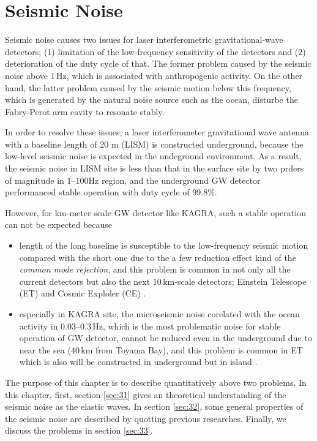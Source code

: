 \chapter{Seismic Noise}
Seismic noise causes two issues for laser interferometric gravitational-wave detectors; (1) limitation of the low-frequency sensitivity of the detectors and (2) deterioration of the duty cycle of that. The former problem caused by the seismic noise above $1\,\mathrm{Hz}$, which is associated with anthropogenic activity. On the other hand, the latter problem caused by the seismic motion below this frequency, which is generated by the natural noise source such as the ocean, disturbe the Fabry-Perot arm cavity to resonate stably.

In order to resolve these issues, a laser interferometer gravitational wave antenna with a baseline length of 20 m (LISM) \cite{sato2004ultrastable} is constructed underground, because the low-level seismic noise is expected in the undeground environment. As a result, the seismic noise in LISM site is less than that in the surface site by two prders of magnitude in $1$--$100\mathrm{Hz}$ region, and the underground GW detector performanced stable operation with duty cycle of $99.8 \%$.

However, for km-meter scale GW detector like KAGRA, such a stable operation can not be expected because
\begin{itemize}
  \setlength{\itemsep}{1pt}      %
  \setlength{\parskip}{-1pt}     %
  \setlength{\itemindent}{0pt}   %
  \setlength{\labelsep}{5pt}     %
\item length of the long baseline is susceptible to the low-frequency seismic motion compared with the short one due to the a few reduction effect kind of the {\it common mode rejection}, and this problem is common in not only all the current detectors but also the next $10\,\mathrm{km}$-scale detectors; Einstein Telescope (ET)\cite{punturo2010einstein} and Cosmic Exploler (CE) \cite{abbott2017exploring}.
\item especially in KAGRA site, the microseismic noise corelated with the ocean activity in $0.03$--$0.3\,\mathrm{Hz}$, which is the most problematic noise for stable operation of GW detector, cannot be reduced even in the underground due to near the sea ($40\,\mathrm{km}$ from Toyama Bay), and this problem is common in ET which is also will be constructed in underground but in island \cite{naticchioni2014microseismic}.
\end{itemize}
The purpose of this chapter is to describe quantitatively above two problems. In this chapter, first, section \cref{sec:31} gives an theoretical understanding of the seismic noise as the elastic waves. In section \cref{sec:32}, some general properties of the seismic noise are described by quotting previous researches. Finally, we discuss the problems in section \cref{sec:33}.



